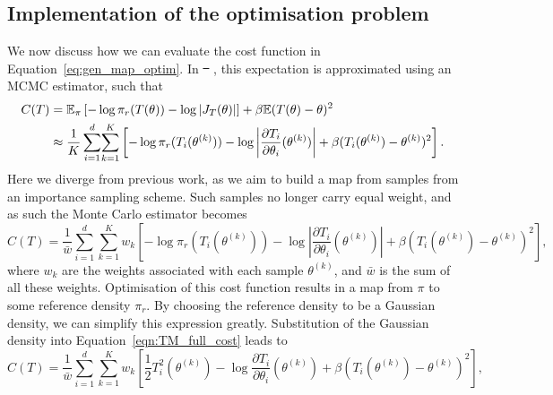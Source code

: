 \documentclass[final]{siamltex}
\providecommand{\DIFadd}[1]{{\protect\color{blue}\uwave{#1}}} %
\providecommand{\DIFdel}[1]{{\protect\color{red}\sout{#1}}}                      %
\providecommand{\DIFaddbegin}{} %
\providecommand{\DIFaddend}{} %
\providecommand{\DIFdelbegin}{} %
\providecommand{\DIFdelend}{} %
\newcommand{\DIFscaledelfig}{0.5}
\newlength{\DIFdelgraphicswidth} %
\newlength{\DIFdelgraphicsheight} %
\newcommand{\DIFaddincludegraphics}[2][]{{\color{blue}\fbox{\DIFOincludegraphics[#1]{#2}}}} %
\newcommand{\DIFdelincludegraphics}[2][]{%
\sbox{\DIFdelgraphicsbox}{\DIFOincludegraphics[#1]{#2}}%
\settoboxwidth{\DIFdelgraphicswidth}{\DIFdelgraphicsbox} %
\settoboxtotalheight{\DIFdelgraphicsheight}{\DIFdelgraphicsbox} %
\scalebox{\DIFscaledelfig}{%
\parbox[b]{\DIFdelgraphicswidth}{\usebox{\DIFdelgraphicsbox}\\[-\baselineskip] \rule{\DIFdelgraphicswidth}{0em}}\llap{\resizebox{\DIFdelgraphicswidth}{\DIFdelgraphicsheight}{%
\setlength{\unitlength}{\DIFdelgraphicswidth}%
\begin{picture}(1,1)%
\thicklines\linethickness{2pt} %
{\color[rgb]{1,0,0}\put(0,0){\framebox(1,1){}}}%
{\color[rgb]{1,0,0}\put(0,0){\line( 1,1){1}}}%
{\color[rgb]{1,0,0}\put(0,1){\line(1,-1){1}}}%
\end{picture}%
}\hspace*{3pt}}} %
} %
\DeclareRobustCommand{\DIFaddbegin}{\DIFOaddbegin \let\includegraphics\DIFaddincludegraphics} %
\DeclareRobustCommand{\DIFaddend}{\DIFOaddend \let\includegraphics\DIFOincludegraphics} %
\DeclareRobustCommand{\DIFdelbegin}{\DIFOdelbegin \let\includegraphics\DIFdelincludegraphics} %
\DeclareRobustCommand{\DIFdelend}{\DIFOaddend \let\includegraphics\DIFOincludegraphics} %
\begin{document}
\DIFdelend \subsection{Implementation of the optimisation problem}\label{sec:transport_implementation}

We now discuss how we can evaluate the cost function in
Equation~\eqref{eq:gen_map_optim}. In \DIFdelbegin \DIFdel{\mbox{%
\cite{parno2014transport}}\hspace{0pt}%
}\DIFdelend \DIFaddbegin \DIFadd{\mbox{%
\cite{parno2018transport}}\hspace{0pt}%
}\DIFaddend , this
expectation is approximated using an MCMC estimator, such that
\begin{align}
	C(T) &= \mathbb{E}_\pi\left[ -\log\pi_r(T(\theta)) - \log|J_T(\theta)|\right] +
			\beta\mathbb{E}(T(\theta)-\theta)^2 \notag \\
		&\approx \frac{1}{K}\sum\limits_{i=1}^d \! \sum\limits_{k=1}^K \left[-\log\pi_r(T_i(\theta^{(k)})) -
			\log\left|\frac{\partial T_i}{\partial \theta_i}(\theta^{(k)})\right| + \beta(T_i(\theta^{(k)})-\theta^{(k)})^2\right]. 
\end{align}
Here we diverge from previous work, as we aim to build a map from
samples from an importance sampling scheme. Such samples no longer
carry equal weight, and as such the Monte Carlo estimator becomes
\begin{equation}\label{eqn:TM_full_cost}
	C(T) = \frac{1}{\bar{w}}\sum\limits_{i=1}^d \! \sum\limits_{k=1}^K
		w_k \left[-\log\pi_r(T_i(\theta^{(k)})) -
			\log\left|\frac{\partial T_i}{\partial \theta_i}(\theta^{(k)})\right| + \beta(T_i(\theta^{(k)})-\theta^{(k)})^2\right],
\end{equation}
where $w_k$ are the weights associated with each sample $\theta^{(k)}$, and $\bar{w}$ is the sum of
all these weights. Optimisation of this cost function results in a map from $\pi$ to some reference density $\pi_r$. By choosing the reference density to be a Gaussian density, we can simplify this expression greatly. Substitution of the Gaussian density into Equation~\eqref{eqn:TM_full_cost} leads to
\begin{equation}\label{eqn:TETAIS_objective}
	C(T) = \frac{1}{\bar{w}}\sum\limits_{i=1}^d \! \sum\limits_{k=1}^K
		w_k\left[\frac{1}{2}T_i^2(\theta^{(k)}) - \log\frac{\partial
		T_i}{\partial\theta_i}(\theta^{(k)}) + \beta(T_i(\theta^{(k)})-\theta^{(k)})^2\right],
\end{equation}
\end{document}
